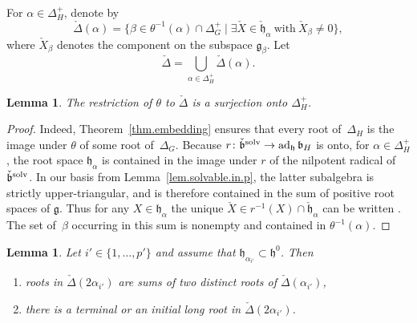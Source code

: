 \documentclass[10pt,a4paper]{amsart}
\numberwithin{equation}{section}
\newtheorem{lem}[thm]{Lemma}
\theoremstyle{definition}
\newcommand{\lieg}{\mathfrak{g}}
\newcommand{\lieh}{\mathfrak{h}}
\def\h{{\mathfrak h}}
\def\b{{\mathfrak b}}
\begin{document}
For $\alpha \in \Delta_H^+$, denote by
\[\check{\Delta}(\alpha) = \bigl\{ \beta \in \theta^{-1}(\alpha) \cap \Delta_G^+ \mid \exists \check{X} \in \check{\lieh}_\alpha \ \mbox{with} \ \check{X}_\beta \neq 0 \bigr\},\]
where $\check{X}_\beta$ denotes the component on the subspace $\lieg_\beta$.
 Let
 \[\check{\Delta} = \bigcup_{\alpha \in \Delta_H^+} \check{\Delta}(\alpha).\]
\begin{lem}
 The restriction of $\theta$ to $\check{\Delta}$ is a surjection onto $\Delta_H^+$.
 \end{lem}

 \begin{proof}
 Indeed, Theorem~\ref{thm.embedding} ensures that every root of~$\Delta_H$ is the image under $\theta$ of some root of~$\Delta_G$.
Because $r \colon \check{\b}^{\rm solv} \rightarrow \operatorname{ad}_\h \b_H$ is onto, for $\alpha \in \Delta_H^+$, the root space $\lieh_\alpha$ is contained in the
image under $r$ of the nilpotent radical
 of $\check{\b}^{\rm solv}$. In our basis from Lemma~\ref{lem.solvable.in.p}, the latter subalgebra is strictly upper-triangular,
and is therefore contained in the sum of positive root spaces of $\lieg$. Thus for any $X \in \lieh_\alpha$ the unique $\check{X} \in r^{-1}(X) \cap \check{\lieh}_\alpha$ can be written . The set of~$\beta$ occurring in this sum is nonempty and contained in $\theta^{-1}(\alpha)$.
\end{proof}

\begin{lem}\label{lem.root.lifts}
Let $i' \in \{ 1, \dots, p' \}$ and assume that $\lieh_{ \alpha_{i'}} \subset \lieh^0$. Then
\begin{enumerate}\itemsep=0pt
\item[$(1)$] roots in $\check{\Delta} (2 \alpha_{i'} )$ are sums of two distinct roots of $\check{\Delta}(\alpha_{i'})$,
\item[$(2)$] there is a terminal or an initial long root in $\check{\Delta}(2 \alpha_{i'})$.
\end{enumerate}
\end{lem}
\end{document}
